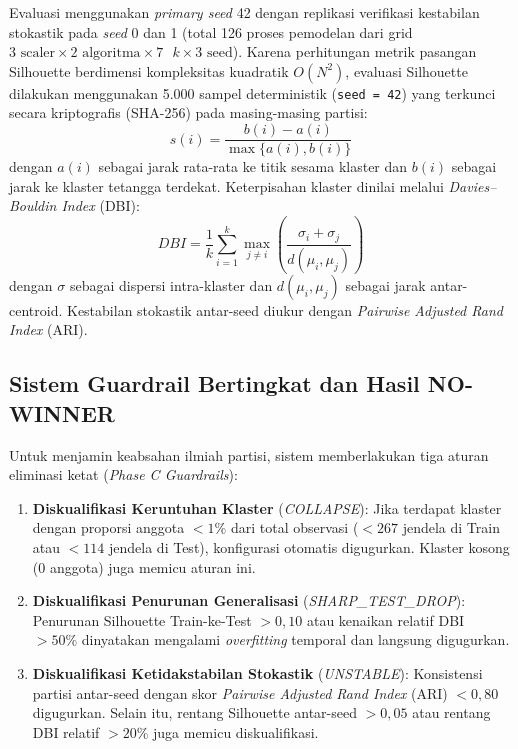 \documentclass[conference]{IEEEtran}
\begin{document}
Evaluasi menggunakan \textit{primary seed} 42 dengan replikasi verifikasi kestabilan stokastik pada \textit{seed} 0 dan 1 (total 126 proses pemodelan dari grid $3 \text{ scaler} \times 2 \text{ algoritma} \times 7 \text{ } k \times 3 \text{ seed}$). Karena perhitungan metrik pasangan Silhouette berdimensi kompleksitas kuadratik $O(N^2)$, evaluasi Silhouette dilakukan menggunakan 5.000 sampel deterministik (\texttt{seed = 42}) yang terkunci secara kriptografis (SHA-256) pada masing-masing partisi:
\begin{equation}
s(i) = \frac{b(i) - a(i)}{\max\{a(i), b(i)\}}
\end{equation}
dengan $a(i)$ sebagai jarak rata-rata ke titik sesama klaster dan $b(i)$ sebagai jarak ke klaster tetangga terdekat. Keterpisahan klaster dinilai melalui \textit{Davies--Bouldin Index} (DBI):
\begin{equation}
DBI = \frac{1}{k} \sum_{i=1}^{k} \max_{j \neq i} \left( \frac{\sigma_i + \sigma_j}{d(\mu_i, \mu_j)} \right)
\end{equation}
dengan $\sigma$ sebagai dispersi intra-klaster dan $d(\mu_i, \mu_j)$ sebagai jarak antar-centroid. Kestabilan stokastik antar-seed diukur dengan \textit{Pairwise Adjusted Rand Index} (ARI).

\subsection{Sistem Guardrail Bertingkat dan Hasil NO-WINNER}
Untuk menjamin keabsahan ilmiah partisi, sistem memberlakukan tiga aturan eliminasi ketat (\textit{Phase C Guardrails}):

\begin{enumerate}
\item \textbf{Diskualifikasi Keruntuhan Klaster} (\textit{COLLAPSE}): Jika terdapat klaster dengan proporsi anggota $< 1\%$ dari total observasi ($< 267$ jendela di Train atau $< 114$ jendela di Test), konfigurasi otomatis digugurkan. Klaster kosong (0 anggota) juga memicu aturan ini.

\item \textbf{Diskualifikasi Penurunan Generalisasi} (\textit{SHARP\_\-TEST\_\-DROP}): Penurunan Silhouette Train-ke-Test $> 0{,}10$ atau kenaikan relatif DBI $> 50\%$ dinyatakan mengalami \textit{overfitting} temporal dan langsung digugurkan.

\item \textbf{Diskualifikasi Ketidakstabilan Stokastik} (\textit{UNSTABLE}): Konsistensi partisi antar-seed dengan skor \textit{Pairwise Adjusted Rand Index} (ARI) $< 0{,}80$ digugurkan. Selain itu, rentang Silhouette antar-seed $> 0{,}05$ atau rentang DBI relatif $> 20\%$ juga memicu diskualifikasi.
\end{enumerate}
\end{document}
